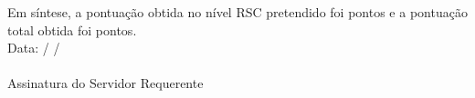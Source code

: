 Em síntese, a pontuação obtida no nível RSC pretendido foi \ifnum\the{} \rscipontostotal\else \ifnum\the{} \rsciipontostotal\else \ifnum\the{} \rsciiipontostotal \fi \fi \fi \space pontos e a pontuação total obtida foi \rscpontostotal \space pontos.
\\
Data: \underline{\hspace{0.3in}} / \underline{\hspace{0.3in}} / \underline{\hspace{0.3in}}
\\
\underline{\hspace{5in}}\\
Assinatura do Servidor Requerente